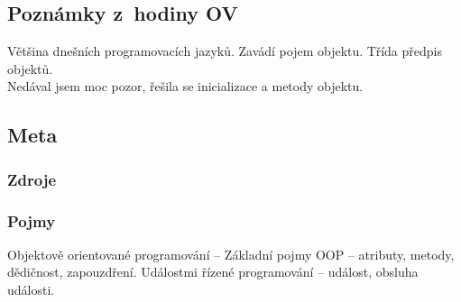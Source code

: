 \documentclass[12pt]{article}
\begin{document}
\subsection{Poznámky z~hodiny OV}
Většina dnešních programovacích jazyků. Zavádí pojem objektu. Třída předpis objektů.\\
Nedával jsem moc pozor, řešila se inicializace a metody objektu.

\subsection{Meta}
\subsubsection{Zdroje}
\subsubsection{Pojmy}
Objektově orientované programování – Základní pojmy OOP – atributy, metody, dědičnost, zapouzdření. Událostmi řízené programování – událost, obsluha události.
\end{document}
